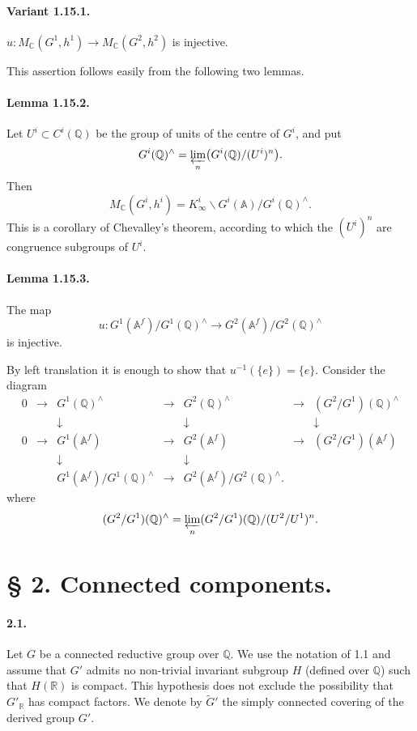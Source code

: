 \documentclass[10pt]{article}
\newcommand{\A}{\mathbb A}
\newcommand{\Af}{\mathbb A^f}
\newcommand{\C}{\mathbb C}
\newcommand{\Q}{\mathbb Q}
\newcommand{\R}{\mathbb R}
\newcommand{\limproj}{\varprojlim}
\newcommand{\MC}{M_{\C}}
\begin{document}
\paragraph{Variant 1.15.1.} $u:\MC(G^1,h^1)\longrightarrow\MC(G^2,h^2)$ is injective.



This assertion follows easily from the following two lemmas.

\paragraph{Lemma 1.15.2.} Let $U^i\subset C^i(\Q)$ be the group of units of the centre of $G^i$, and put
\[
G^i(\Q)^\wedge=\limproj_n\bigl(G^i(\Q)/(U^i)^n\bigr).
\]
Then
\[
\MC(G^i,h^i)=K^i_\infty\backslash G^i(\A)/G^i(\Q)^\wedge .
\]
This is a corollary of Chevalley's theorem, according to which the $(U^i)^n$ are congruence subgroups of $U^i$.

\paragraph{Lemma 1.15.3.} The map
\[
u:G^1(\Af)/G^1(\Q)^\wedge\longrightarrow G^2(\Af)/G^2(\Q)^\wedge
\]
is injective.

By left translation it is enough to show that $u^{-1}(\{e\})=\{e\}$. Consider the diagram
\[
\begin{array}{ccccccccc}
0&\longrightarrow&G^1(\Q)^\wedge&\longrightarrow&G^2(\Q)^\wedge&\longrightarrow&(G^2/G^1)(\Q)^\wedge\\
&&\downarrow&&\downarrow&&\downarrow\!\\
0&\longrightarrow&G^1(\Af)&\longrightarrow&G^2(\Af)&\longrightarrow&(G^2/G^1)(\Af)\\
&&\downarrow&&\downarrow&&\\
&&G^1(\Af)/G^1(\Q)^\wedge&\longrightarrow&G^2(\Af)/G^2(\Q)^\wedge.&&
\end{array}
\]
where
\[
(G^2/G^1)(\Q)^\wedge=\limproj_n (G^2/G^1)(\Q)/(U^2/U^1)^n .
\]

\section*{§ 2. Connected components.}

\paragraph{2.1.} Let $G$ be a connected reductive group over $\Q$. We use the notation of 1.1 and assume that $G'$ admits no non-trivial invariant subgroup $H$ (defined over $\Q$) such that $H(\R)$ is compact. This hypothesis does not exclude the possibility that $G'_\R$ has compact factors. We denote by $\widetilde G'$ the simply connected covering of the derived group $G'$.
\end{document}
